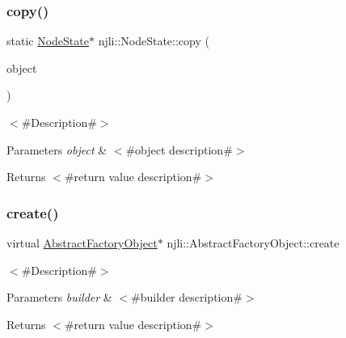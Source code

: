\subsubsection{\texorpdfstring{copy()}{copy()}}
{\footnotesize\ttfamily static \mbox{\hyperlink{classnjli_1_1_node_state}{Node\+State}}$\ast$ njli\+::\+Node\+State\+::copy (\begin{DoxyParamCaption}\item[{const \mbox{\hyperlink{classnjli_1_1_node_state}{Node\+State}} \&}]{object }\end{DoxyParamCaption})\hspace{0.3cm}{\ttfamily [static]}}

$<$\#\+Description\#$>$


\begin{DoxyParams}{Parameters}
{\em object} & $<$\#object description\#$>$\\
\hline
\end{DoxyParams}
\begin{DoxyReturn}{Returns}
$<$\#return value description\#$>$ 
\end{DoxyReturn}
\mbox{\label{classnjli_1_1_node_state_a83a8876ae63b92804004cf3febe76573}} 
\subsubsection{\texorpdfstring{create()}{create()}\hspace{0.1cm}{\footnotesize\ttfamily [1/3]}}
{\footnotesize\ttfamily virtual \mbox{\hyperlink{classnjli_1_1_abstract_factory_object}{Abstract\+Factory\+Object}}$\ast$ njli\+::\+Abstract\+Factory\+Object\+::create}

$<$\#\+Description\#$>$


\begin{DoxyParams}{Parameters}
{\em builder} & $<$\#builder description\#$>$\\
\hline
\end{DoxyParams}
\begin{DoxyReturn}{Returns}
$<$\#return value description\#$>$ 
\end{DoxyReturn}
\mbox{\label{classnjli_1_1_node_state_a00caefaec4d9b4a16c76d6020882f720}} 
